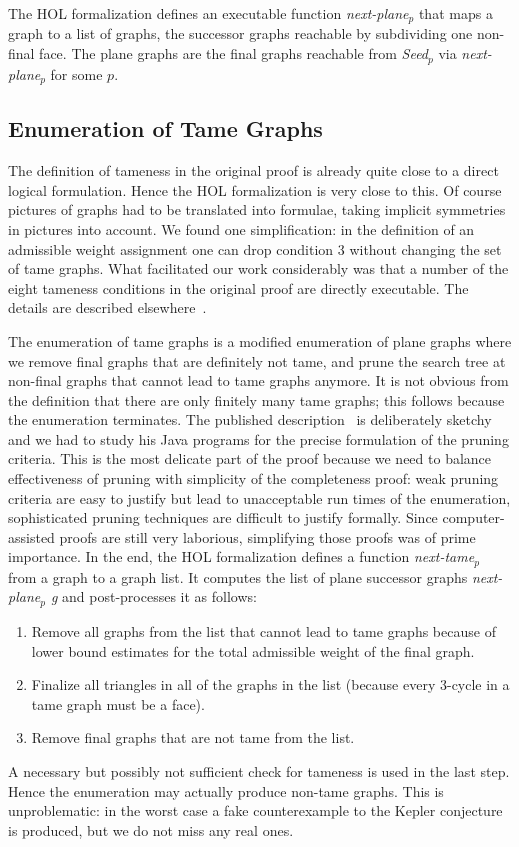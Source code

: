 \documentclass[11pt]{amsart}
\begin{document}
The HOL formalization defines an executable function
\textit{next-plane$_p$} that maps a
graph to a list of graphs, the successor graphs reachable by subdividing one
non-final face.  The plane graphs are the final graphs reachable from
\textit{Seed$_p$} via \textit{next-plane$_p$} for some $p$.

\subsection*{Enumeration of Tame Graphs}

The definition of tameness in the original proof is already quite close to a direct logical
formulation. Hence the HOL formalization is very close to this. Of course
pictures of graphs had to be translated into formulae, taking implicit
symmetries in pictures into account. We found one simplification: in the
definition of an admissible weight assignment one can drop condition 3
without changing the set of tame graphs. What facilitated our work
considerably was that a number of the eight tameness conditions 
in the original proof are directly
executable. The details are described elsewhere~\cite{NipkowBS-IJCAR06}.

The enumeration of tame graphs is a modified enumeration of plane graphs
where we remove final graphs that are definitely not tame, and prune the
search tree at non-final graphs that cannot lead to tame graphs anymore.  It
is not obvious from the definition that there are only finitely many tame
graphs; this follows because the enumeration terminates. The published
description~\cite{Hales:2006:DCG} is deliberately sketchy and we had to study
his Java programs for the precise formulation of the pruning criteria.  This
is the most delicate part of the proof because we need to balance
effectiveness of pruning with simplicity of the completeness proof: weak
pruning criteria are easy to justify but lead to unacceptable run times of
the enumeration, sophisticated pruning techniques are difficult to justify
formally. Since computer-assisted proofs are still very laborious,
simplifying those proofs was of prime importance. In the end, the HOL
formalization defines a function \textit{next-tame$_p$}
from a graph to a graph list. It computes the list of plane successor graphs
\textit{next-plane$_p$ g} and post-processes it as follows:
\begin{enumerate}
\item Remove all graphs from the list that cannot lead to tame graphs
because of lower bound estimates for the total admissible weight of the final
graph.
\item Finalize all triangles in all of the graphs in the list
(because every 3-cycle in a tame graph must be a face).
\item Remove final graphs that are not tame from the list.
\end{enumerate}
A necessary but possibly not sufficient check for tameness is used in the last
step. Hence the enumeration may actually produce non-tame graphs. This is
unproblematic: in the worst case a fake counterexample to the Kepler
conjecture is produced, but we do not miss any real ones.
\end{document}
